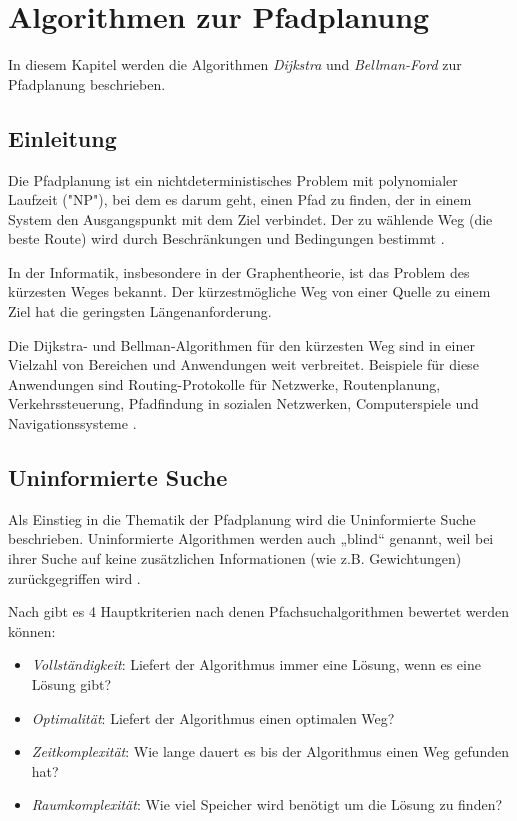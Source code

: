 \chapter{Algorithmen zur Pfadplanung}
In diesem Kapitel werden die Algorithmen \emph{Dijkstra} und \emph{Bellman-Ford} zur Pfadplanung beschrieben.

\section{Einleitung}
\label{Was ist Pfadplanung?}
Die Pfadplanung ist ein nichtdeterministisches Problem mit polynomialer Laufzeit ("NP"), bei dem es darum geht, einen Pfad zu finden, 
der in einem System den Ausgangspunkt mit dem Ziel verbindet. Der zu wählende Weg (die beste Route) wird durch Beschränkungen 
und Bedingungen bestimmt \cite{Karur:21}.

In der Informatik, insbesondere in der Graphentheorie, ist das Problem des kürzesten Weges bekannt. Der kürzestmögliche Weg von 
einer Quelle zu einem Ziel hat die geringsten Längenanforderung.

Die Dijkstra- und Bellman-Algorithmen für den kürzesten Weg sind in einer Vielzahl von Bereichen und Anwendungen
weit verbreitet. Beispiele für diese Anwendungen sind Routing-Protokolle für Netzwerke, Routenplanung, 
Verkehrssteuerung, Pfadfindung in sozialen Netzwerken, Computerspiele und Navigationssysteme \cite{Panda:18}.

\section{Uninformierte Suche}
\label{Uninformierte Suche}
Als Einstieg in die Thematik der Pfadplanung wird die Uninformierte Suche beschrieben.
Uninformierte Algorithmen werden auch „blind“ genannt, weil bei ihrer 
Suche auf keine zusätzlichen Informationen (wie z.B. Gewichtungen) zurückgegriffen wird \cite[80-82]{Russell:10}.

Nach \cite[80-82]{Russell:10} gibt es 4 Hauptkriterien nach denen Pfachsuchalgorithmen bewertet werden können:
\begin{itemize}
	\item \emph{Vollständigkeit}: Liefert der Algorithmus immer eine Lösung, wenn es eine Lösung gibt?
	\item \emph{Optimalität}: Liefert der Algorithmus einen optimalen Weg?
	\item \emph{Zeitkomplexität}: Wie lange dauert es bis der Algorithmus einen Weg gefunden hat?
	\item \emph{Raumkomplexität}: Wie viel Speicher wird benötigt um die Lösung zu finden?
\end{itemize}
\newpage
